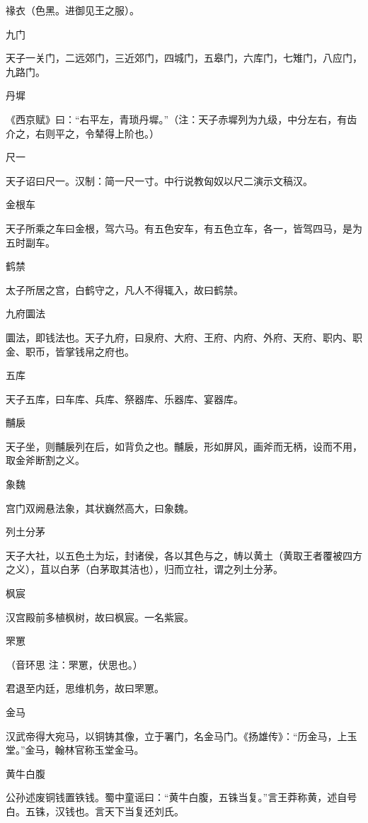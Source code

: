 \documentclass[a4paper,12pt,UTF8,twoside]{ctexbook}
\begin{document}
    禒衣（色黑。进御见王之服）。
    
    九门
    
    天子一关门，二远郊门，三近郊门，四城门，五皋门，六库门，七雉门，八应门，九路门。
    
    丹墀
    
    《西京赋》曰：“右平左，青琐丹墀。”（注：天子赤墀列为九级，中分左右，有齿介之，右则平之，令辇得上阶也。）
    
    尺一
    
    天子诏曰尺一。汉制：简一尺一寸。中行说教匈奴以尺二演示文稿汉。
    
    金根车
    
    天子所乘之车曰金根，驾六马。有五色安车，有五色立车，各一，皆驾四马，是为五时副车。
    
    鹤禁
    
    太子所居之宫，白鹤守之，凡人不得辄入，故曰鹤禁。
    
    九府圜法
    
    圜法，即钱法也。天子九府，曰泉府、大府、王府、内府、外府、天府、职内、职金、职币，皆掌钱帛之府也。
    
    五库
    
    天子五库，曰车库、兵库、祭器库、乐器库、宴器库。
    
    黼扆
    
    天子坐，则黼扆列在后，如背负之也。黼扆，形如屏风，画斧而无柄，设而不用，取金斧断割之义。
    
    象魏
    
    宫门双阙悬法象，其状巍然高大，曰象魏。
    
    列土分茅
    
    天子大社，以五色土为坛，封诸侯，各以其色与之，帱以黄土（黄取王者覆被四方之义），苴以白茅（白茅取其洁也），归而立社，谓之列土分茅。
    
    枫宸
    
    汉宫殿前多植枫树，故曰枫宸。一名紫宸。
    
    罘罳
    
    （音环思 注：罘罳，伏思也。）
    
    君退至内廷，思维机务，故曰罘罳。
    
    金马
    
    汉武帝得大宛马，以铜铸其像，立于署门，名金马门。《扬雄传》：“历金马，上玉堂。”金马，翰林官称玉堂金马。
    
    黄牛白腹
    
    公孙述废铜钱置铁钱。蜀中童谣曰：“黄牛白腹，五铢当复。”言王莽称黄，述自号白。五铢，汉钱也。言天下当复还刘氏。
    
\end{document}
